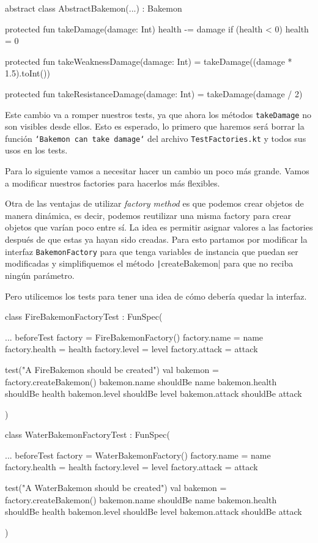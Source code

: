   \begin{kotlin}
    abstract class AbstractBakemon(...) : Bakemon {
      protected fun takeDamage(damage: Int) {
        health -= damage
        if (health < 0) {
          health = 0
        }
      }

      protected fun takeWeaknessDamage(damage: Int) = takeDamage((damage * 1.5).toInt())

      protected fun takeResistanceDamage(damage: Int) = takeDamage(damage / 2)
    }
  \end{kotlin}

  Este cambio va a romper nuestros tests, ya que ahora los métodos \texttt{takeDamage}
  no son visibles desde ellos.
  Esto es esperado, lo primero que haremos será borrar la función 
  \texttt{`Bakemon can take damage`} del archivo \texttt{TestFactories.kt} y todos sus
  usos en los tests.

  Para lo siguiente vamos a necesitar hacer un cambio un poco más grande.
  Vamos a modificar nuestros factories para hacerlos más flexibles.

  Otra de las ventajas de utilizar \textit{factory method} es que
  podemos crear objetos de manera dinámica, es decir, podemos reutilizar una misma factory para
  crear objetos que varían poco entre sí.
  La idea es permitir asignar valores a las factories después de que estas ya hayan sido creadas.
  Para esto partamos por modificar la interfaz \texttt{BakemonFactory} para que tenga
  variables de instancia que puedan ser modificadas y simplifiquemos el método 
  \texttt|createBakemon| para que no reciba ningún parámetro.

  Pero utilicemos los tests para tener una idea de cómo debería quedar la interfaz.

  \begin{kotlin}
    class FireBakemonFactoryTest : FunSpec({
      ...
      beforeTest {
        factory = FireBakemonFactory()
        factory.name = name
        factory.health = health
        factory.level = level
        factory.attack = attack
      }

      test("A FireBakemon should be created") {
        val bakemon = factory.createBakemon()
        bakemon.name shouldBe name
        bakemon.health shouldBe health
        bakemon.level shouldBe level
        bakemon.attack shouldBe attack
      }
    })
  \end{kotlin}

  \begin{kotlin}
    class WaterBakemonFactoryTest : FunSpec({
      ...
      beforeTest {
          factory = WaterBakemonFactory()
          factory.name = name
          factory.health = health
          factory.level = level
          factory.attack = attack
      }

      test("A WaterBakemon should be created") {
          val bakemon = factory.createBakemon()
          bakemon.name shouldBe name
          bakemon.health shouldBe health
          bakemon.level shouldBe level
          bakemon.attack shouldBe attack
      }
    })
  \end{kotlin}

